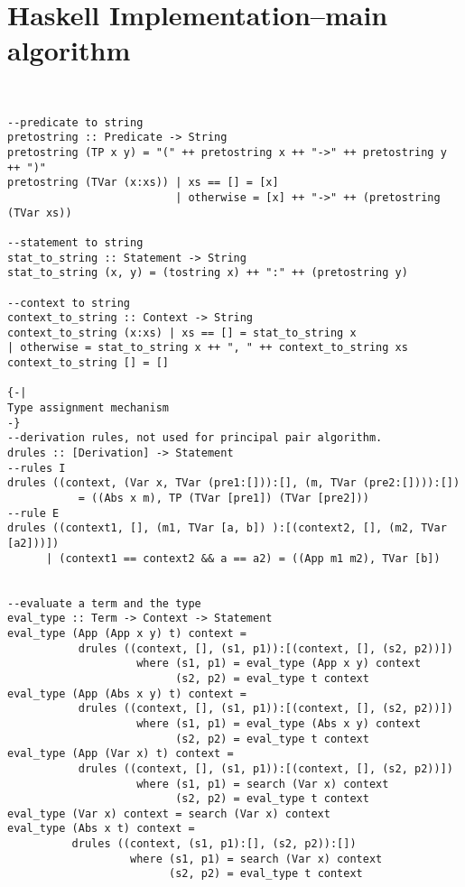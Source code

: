 \appendix
\chapter{Haskell Implementation--main algorithm}\label{ap:a}
\begin{verbatim}


--predicate to string
pretostring :: Predicate -> String
pretostring (TP x y) = "(" ++ pretostring x ++ "->" ++ pretostring y ++ ")"
pretostring (TVar (x:xs)) | xs == [] = [x]
                          | otherwise = [x] ++ "->" ++ (pretostring (TVar xs))
                          
--statement to string
stat_to_string :: Statement -> String
stat_to_string (x, y) = (tostring x) ++ ":" ++ (pretostring y)

--context to string
context_to_string :: Context -> String
context_to_string (x:xs) | xs == [] = stat_to_string x
| otherwise = stat_to_string x ++ ", " ++ context_to_string xs
context_to_string [] = []

{-|
Type assignment mechanism
-}
--derivation rules, not used for principal pair algorithm.
drules :: [Derivation] -> Statement
--rules I
drules ((context, (Var x, TVar (pre1:[])):[], (m, TVar (pre2:[]))):[]) 
           = ((Abs x m), TP (TVar [pre1]) (TVar [pre2]))
--rule E
drules ((context1, [], (m1, TVar [a, b]) ):[(context2, [], (m2, TVar [a2]))]) 
      | (context1 == context2 && a == a2) = ((App m1 m2), TVar [b])


--evaluate a term and the type
eval_type :: Term -> Context -> Statement
eval_type (App (App x y) t) context =
           drules ((context, [], (s1, p1)):[(context, [], (s2, p2))])
                    where (s1, p1) = eval_type (App x y) context
                          (s2, p2) = eval_type t context
eval_type (App (Abs x y) t) context = 
           drules ((context, [], (s1, p1)):[(context, [], (s2, p2))])
                    where (s1, p1) = eval_type (Abs x y) context
                          (s2, p2) = eval_type t context
eval_type (App (Var x) t) context = 
           drules ((context, [], (s1, p1)):[(context, [], (s2, p2))])
                    where (s1, p1) = search (Var x) context
                          (s2, p2) = eval_type t context
eval_type (Var x) context = search (Var x) context
eval_type (Abs x t) context = 
          drules ((context, (s1, p1):[], (s2, p2)):[])
                   where (s1, p1) = search (Var x) context
                         (s2, p2) = eval_type t context
                         

\end{verbatim}
